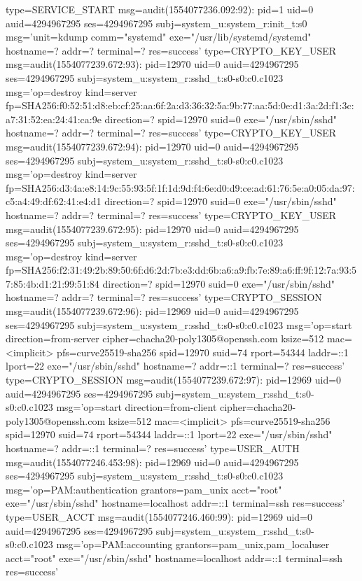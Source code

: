 \documentclass[]{report}
\newenvironment{Shaded}{}{}
\newcommand{\NormalTok}[1]{#1}
\begin{document}
\begin{Shaded}
\begin{Highlighting}[]
\NormalTok{type=SERVICE_START msg=audit(1554077236.092:92): pid=1 uid=0 auid=4294967295 ses=4294967295 subj=system_u:system_r:init_t:s0 msg='unit=kdump comm="systemd" exe="/usr/lib/systemd/systemd" hostname=? addr=? terminal=? res=success'}
\NormalTok{type=CRYPTO_KEY_USER msg=audit(1554077239.672:93): pid=12970 uid=0 auid=4294967295 ses=4294967295 subj=system_u:system_r:sshd_t:s0-s0:c0.c1023 msg='op=destroy kind=server fp=SHA256:f0:52:51:d8:eb:cf:25:aa:6f:2a:d3:36:32:5a:9b:77:aa:5d:0e:d1:3a:2d:f1:3c:a7:31:52:ea:24:41:ca:9e direction=? spid=12970 suid=0  exe="/usr/sbin/sshd" hostname=? addr=? terminal=? res=success'}
\NormalTok{type=CRYPTO_KEY_USER msg=audit(1554077239.672:94): pid=12970 uid=0 auid=4294967295 ses=4294967295 subj=system_u:system_r:sshd_t:s0-s0:c0.c1023 msg='op=destroy kind=server fp=SHA256:d3:4a:e8:14:9c:55:93:5f:1f:1d:9d:f4:6e:d0:d9:ce:ad:61:76:5e:a0:05:da:97:c5:a4:49:df:62:41:e4:d1 direction=? spid=12970 suid=0  exe="/usr/sbin/sshd" hostname=? addr=? terminal=? res=success'}
\NormalTok{type=CRYPTO_KEY_USER msg=audit(1554077239.672:95): pid=12970 uid=0 auid=4294967295 ses=4294967295 subj=system_u:system_r:sshd_t:s0-s0:c0.c1023 msg='op=destroy kind=server fp=SHA256:f2:31:49:2b:89:50:6f:d6:2d:7b:e3:dd:6b:a6:a9:fb:7e:89:a6:ff:9f:12:7a:93:57:85:4b:d1:21:99:51:84 direction=? spid=12970 suid=0  exe="/usr/sbin/sshd" hostname=? addr=? terminal=? res=success'}
\NormalTok{type=CRYPTO_SESSION msg=audit(1554077239.672:96): pid=12969 uid=0 auid=4294967295 ses=4294967295 subj=system_u:system_r:sshd_t:s0-s0:c0.c1023 msg='op=start direction=from-server cipher=chacha20-poly1305@openssh.com ksize=512 mac=<implicit> pfs=curve25519-sha256 spid=12970 suid=74 rport=54344 laddr=::1 lport=22  exe="/usr/sbin/sshd" hostname=? addr=::1 terminal=? res=success'}
\NormalTok{type=CRYPTO_SESSION msg=audit(1554077239.672:97): pid=12969 uid=0 auid=4294967295 ses=4294967295 subj=system_u:system_r:sshd_t:s0-s0:c0.c1023 msg='op=start direction=from-client cipher=chacha20-poly1305@openssh.com ksize=512 mac=<implicit> pfs=curve25519-sha256 spid=12970 suid=74 rport=54344 laddr=::1 lport=22  exe="/usr/sbin/sshd" hostname=? addr=::1 terminal=? res=success'}
\NormalTok{type=USER_AUTH msg=audit(1554077246.453:98): pid=12969 uid=0 auid=4294967295 ses=4294967295 subj=system_u:system_r:sshd_t:s0-s0:c0.c1023 msg='op=PAM:authentication grantors=pam_unix acct="root" exe="/usr/sbin/sshd" hostname=localhost addr=::1 terminal=ssh res=success'}
\NormalTok{type=USER_ACCT msg=audit(1554077246.460:99): pid=12969 uid=0 auid=4294967295 ses=4294967295 subj=system_u:system_r:sshd_t:s0-s0:c0.c1023 msg='op=PAM:accounting grantors=pam_unix,pam_localuser acct="root" exe="/usr/sbin/sshd" hostname=localhost addr=::1 terminal=ssh res=success'}

\end{Highlighting}
\end{Shaded}
\end{document}
